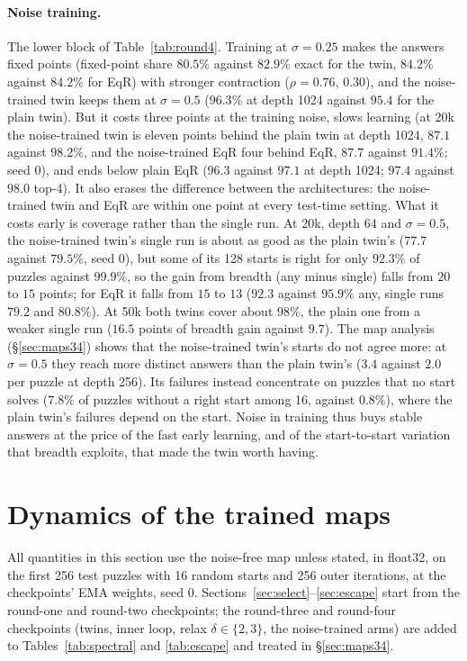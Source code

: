 \documentclass[11pt]{article}
\theoremstyle{definition}
\begin{document}
\paragraph{Noise training.} The lower block of Table~\ref{tab:round4}. Training at $\sigma=0.25$ makes the answers fixed points (fixed-point share
$80.5\%$ against $82.9\%$ exact for the twin, $84.2\%$ against $84.2\%$ for EqR) with stronger contraction ($\rho=0.76$, $0.30$), and the noise-trained twin keeps them at
$\sigma=0.5$ ($96.3\%$ at depth 1024 against $95.4$ for the plain twin). But it costs three points at the training noise, slows learning
(at 20k the noise-trained twin is eleven points behind the plain twin at depth 1024, $87.1$ against $98.2\%$, and the noise-trained EqR four
behind EqR, $87.7$ against $91.4\%$; seed 0), and ends below plain EqR ($96.3$ against $97.1$ at
depth 1024; $97.4$ against $98.0$ top-4). It also erases the difference between the architectures: the noise-trained twin and EqR are within
one point at every test-time setting. What it costs early is coverage rather than the single run. At 20k, depth 64 and $\sigma=0.5$, the
noise-trained twin's single run is about as good as the plain twin's ($77.7$ against $79.5\%$, seed 0), but some of its 128 starts is right for
only $92.3\%$ of puzzles against $99.9\%$, so the gain from breadth (any minus single) falls from $20$ to $15$ points; for EqR it falls from
$15$ to $13$ ($92.3$ against $95.9\%$ any, single runs $79.2$ and $80.8\%$). At 50k both twins cover about $98\%$, the plain one from a weaker
single run ($16.5$ points of breadth gain against $9.7$). The map analysis (\S\ref{sec:maps34}) shows that the noise-trained twin's starts do
not agree more: at $\sigma=0.5$ they reach more distinct answers than the plain twin's ($3.4$ against $2.0$ per puzzle at depth 256). Its failures
instead concentrate on puzzles that no start solves ($7.8\%$ of puzzles without a right start among 16, against $0.8\%$), where the plain
twin's failures depend on the start. Noise in training thus buys stable answers at the price of the fast early learning, and of the
start-to-start variation that breadth exploits, that made the twin worth having.

\section{Dynamics of the trained maps}\label{sec:maps}

All quantities in this section use the noise-free map unless stated, in float32, on the first 256 test puzzles with 16 random starts and 256
outer iterations, at the checkpoints' EMA weights, seed 0. Sections~\ref{sec:select}--\ref{sec:escape} start from the round-one and round-two
checkpoints; the round-three and round-four checkpoints (twins, inner loop, relax $\delta\in\{2,3\}$, the noise-trained arms) are added to
Tables~\ref{tab:spectral} and \ref{tab:escape} and treated in \S\ref{sec:maps34}.
\end{document}
